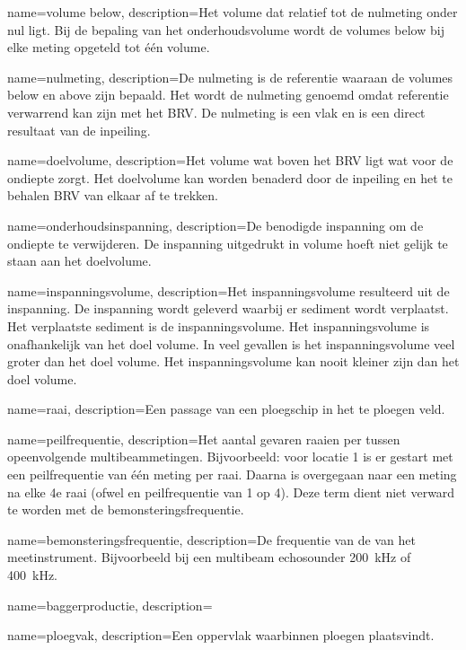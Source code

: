 {
	name={volume below},
	description={Het volume dat relatief tot de nulmeting onder nul ligt. Bij de bepaling van het onderhoudsvolume wordt de volumes below bij elke meting opgeteld tot één volume.}
}

{
	name={nulmeting},
	description={De nulmeting is de referentie waaraan de volumes below en above zijn bepaald. Het wordt de nulmeting genoemd omdat referentie verwarrend kan zijn met het BRV. De nulmeting is een vlak en is een direct resultaat van de inpeiling.}
}

{
	name={doelvolume},
	description={Het volume wat boven het BRV ligt wat voor de ondiepte zorgt. Het doelvolume kan worden benaderd door de inpeiling en het te behalen BRV van elkaar af te trekken.}
}

{
	name={onderhoudsinspanning},
	description={De benodigde inspanning om de ondiepte te verwijderen. De inspanning uitgedrukt in volume hoeft niet gelijk te staan aan het doelvolume.}
}

{
	name={inspanningsvolume},
	description={Het inspanningsvolume resulteerd uit de inspanning. De inspanning wordt geleverd waarbij er sediment wordt verplaatst. Het verplaatste sediment is de inspanningsvolume. Het inspanningsvolume is onafhankelijk van het doel volume. In veel gevallen is het inspanningsvolume veel groter dan het doel volume. Het inspanningsvolume kan nooit kleiner zijn dan het doel volume.}
}

{
	name={raai},
	description={Een passage van een ploegschip in het te ploegen veld.}
}

{
	name={peilfrequentie},
	description={Het aantal gevaren raaien per tussen opeenvolgende multibeammetingen. Bijvoorbeeld: voor locatie 1 is er gestart met een peilfrequentie van één meting per raai. Daarna is overgegaan naar een meting na elke 4e raai (ofwel en peilfrequentie van 1 op 4). Deze term dient niet verward te worden met de \gls{bemonsteringsfrequentie}.}
}

{
	name={bemonsteringsfrequentie},
	description={De frequentie van de van het meetinstrument. Bijvoorbeeld bij een multibeam echosounder \SI{200}{kHz} of \SI{400}{kHz}.}
}

{
	name={baggerproductie},
	description={}
}

{
	name={ploegvak},
	description={Een oppervlak waarbinnen ploegen plaatsvindt.}
}
